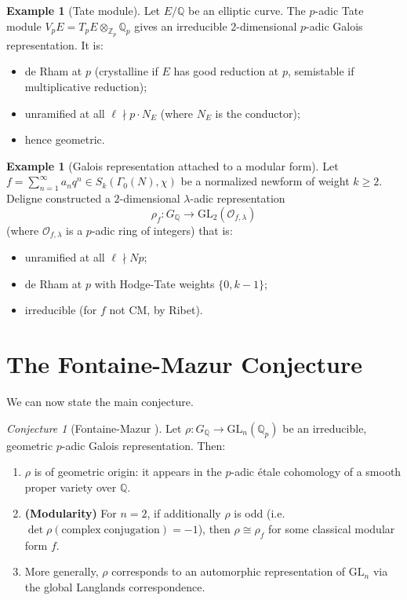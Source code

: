 \documentclass[12pt,a4paper]{amsart}
\theoremstyle{definition}
\newtheorem{example}[theorem]{Example}
\theoremstyle{remark}
\newtheorem{conjecture}[theorem]{Conjecture}
\newcommand{\GL}{\mathrm{GL}}
\newcommand{\Qp}{\mathbb{Q}_p}
\newcommand{\Zp}{\mathbb{Z}_p}
\newcommand{\GQ}{G_{\mathbb{Q}}}
\newcommand{\Q}{\mathbb{Q}}
\begin{document}
\begin{example}[Tate module]
  Let $E/\Q$ be an elliptic curve. The $p$-adic Tate module
  $V_p E = T_p E \otimes_{\Zp} \Qp$
  gives an irreducible $2$-dimensional $p$-adic Galois representation. It is:
  \begin{itemize}
    \item de Rham at $p$ (crystalline if $E$ has good reduction at $p$, semistable if
      multiplicative reduction);
    \item unramified at all $\ell \nmid p \cdot N_E$ (where $N_E$ is the conductor);
    \item hence geometric.
  \end{itemize}
\end{example}

\begin{example}[Galois representation attached to a modular form]
  Let $f = \sum_{n=1}^\infty a_n q^n \in S_k(\Gamma_0(N), \chi)$ be a normalized newform
  of weight $k \geq 2$. Deligne \cite{Deligne1971} constructed a $2$-dimensional
  $\lambda$-adic representation
  \[
    \rho_f \colon \GQ \to \GL_2(\mathcal{O}_{f,\lambda})
  \]
  (where $\mathcal{O}_{f,\lambda}$ is a $p$-adic ring of integers) that is:
  \begin{itemize}
    \item unramified at all $\ell \nmid Np$;
    \item de Rham at $p$ with Hodge-Tate weights $\{0, k-1\}$;
    \item irreducible (for $f$ not CM, by Ribet).
  \end{itemize}
\end{example}

\section{The Fontaine-Mazur Conjecture}\label{sec:fm-statement}

We can now state the main conjecture.

\begin{conjecture}[Fontaine-Mazur \cite{FM1995}]\label{conj:FM}
  Let $\rho\colon \GQ \to \GL_n(\Qp)$ be an irreducible, geometric $p$-adic Galois
  representation. Then:
  \begin{enumerate}[label=(\alph*)]
    \item $\rho$ is of geometric origin: it appears in the $p$-adic étale cohomology of a
      smooth proper variety over $\Q$.
    \item \textbf{(Modularity)} For $n=2$, if additionally $\rho$ is odd (i.e.\
      $\det\rho(\mathrm{complex\;conjugation}) = -1$), then $\rho \cong \rho_f$ for some
      classical modular form $f$.
    \item More generally, $\rho$ corresponds to an automorphic representation of $\GL_n$
      via the global Langlands correspondence.
  \end{enumerate}
\end{conjecture}
\end{document}
